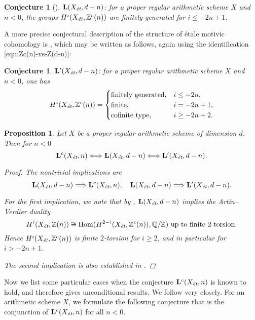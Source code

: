 \documentclass[leqno,12pt]{article}
\theoremstyle{plain}
\newtheorem{proposition}[theorem]{\indent\sc Proposition}
\newtheorem{conjecture}[theorem]{\indent\sc Conjecture}
\theoremstyle{definition}
\DeclareMathOperator{\Hom}{Hom}
\newcommand{\QQ}{\mathbb{Q}}
\newcommand{\ZZ}{\mathbb{Z}}
\newcommand{\et}{\text{\it \'{e}t}}
\begin{document}
\begin{conjecture}[{\cite[Conjecture~3.2; Lemma~3.3]{Flach-Morin-2018}}]
  $\mathbf{L} (X_\et, d-n)$: for a proper regular arithmetic scheme $X$ and
  $n < 0$, the groups $H^i (X_\et, \ZZ^c (n))$ are finitely generated for
  $i \le -2n+1$.
\end{conjecture}

A more precise conjectural description of the structure of \'{e}tale motivic
cohomology is \cite[Conjecture~4.12]{Geisser-2017}, which may be written as
follows, again using the identification \eqref{eqn:Zc(n)-vs-Z(d-n)}:

\begin{conjecture}
  $\mathbf{L}' (X_\et, d-n)$: for a proper regular arithmetic scheme $X$ and
  $n < 0$, one has
  \[ H^i (X_\et, \ZZ^c (n)) = \begin{cases}
      \text{finitely generated}, & i \le -2n, \\
      \text{finite}, & i = -2n + 1, \\
      \text{cofinite type}, & i \ge -2n + 2.
    \end{cases} \]
\end{conjecture}

\begin{proposition}
  \label{prop:Lc-Xet-n-vs-L-Xet-d-n}
  Let $X$ be a proper regular arithmetic scheme of dimension $d$.
  Then for $n < 0$
  \[ \mathbf{L}^c (X_\et, n) \Longleftrightarrow
    \mathbf{L} (X_\et, d-n) \Longleftrightarrow
    \mathbf{L}' (X_\et, d-n). \]

  \begin{proof}
    The nontrivial implications are
    \[
      \mathbf{L} (X_\et, d-n) \Longrightarrow \mathbf{L}^c (X_\et, n),
      \quad
      \mathbf{L} (X_\et, d-n) \Longrightarrow \mathbf{L}' (X_\et, d-n).
    \]

    For the first implication, we note that by
    \cite[Proposition~3.4]{Flach-Morin-2018}, $\mathbf{L} (X_\et, d-n)$ implies
    the Artin--Verdier duality
    \[ H^i (X_\et, \ZZ (n)) \cong \Hom (H^{2-i} (X_\et, \ZZ^c (n)), \QQ/\ZZ)
      \text{ up to finite }2\text{-torsion}. \]
    Hence $H^i (X_\et, \ZZ^c (n))$ is finite $2$-torsion for $i \ge 2$, and in
    particular for $i > -2n + 1$.

    The second implication is also established in
    \cite[Proposition~3.4]{Flach-Morin-2018}.
  \end{proof}
\end{proposition}

Now we list some particular cases when the conjecture $\mathbf{L}^c (X_\et,n)$
is known to hold, and therefore gives unconditional results. We follow
\cite[\S 5]{Morin-2014} very closely. For an arithmetic scheme $X$, we formulate
the following conjecture that is the conjunction of $\mathbf{L}^c (X_\et,n)$ for
all $n < 0$.
\end{document}
